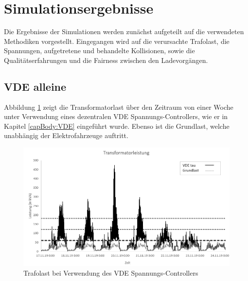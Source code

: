 \section{Simulationsergebnisse}
Die Ergebnisse der Simulationen werden zunächst aufgeteilt auf die verwendeten Methodiken vorgestellt. Eingegangen wird auf die verursachte Trafolast, die Spannungen, aufgetretene und behandelte Kollisionen, sowie die Qualitätserfahrungen und die Fairness zwischen den Ladevorgängen. 
\subsection{VDE alleine}
Abbildung \ref{Abb_VDEtauTrafoLast} zeigt die Transformatorlast über den Zeitraum von einer Woche unter Verwendung eines dezentralen VDE Spannungs-Controllers, wie er in Kapitel \ref{capBody:VDE} eingeführt wurde. Ebenso ist die Grundlast, welche unabhängig der Elektrofahrzeuge auftritt. \\
\begin{figure}[htb]
\centering
	\includegraphics[scale=0.7]{img/VDE_tau/TrafoLast5.png}
	\caption{Trafolast bei Verwendung des VDE Spannungs-Controllers}
	\label{Abb_VDEtauTrafoLast}
\end{figure}

